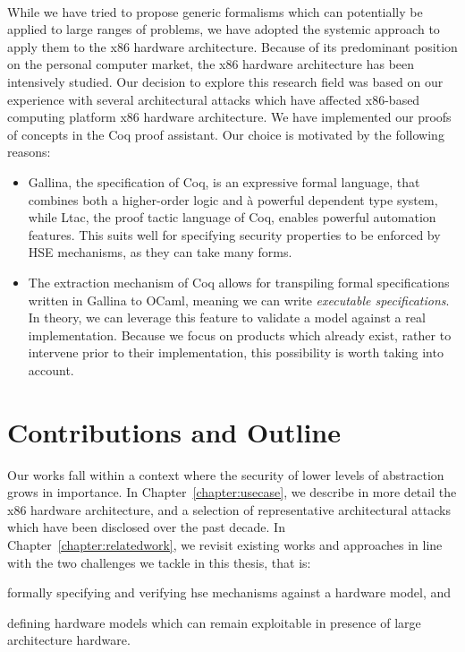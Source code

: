 \paragraph{}
%
While we have tried to propose generic formalisms which can potentially be
applied to large ranges of problems, we have adopted the systemic approach to
apply them to the x86 hardware architecture.
%
Because of its predominant position on the personal computer market, the x86
hardware architecture has been intensively studied.
%
Our decision to explore this research field was based on our experience with
several architectural attacks which have affected x86-based computing platform
x86 hardware architecture.
%
We have implemented our proofs of concepts in the Coq proof assistant.
%
Our choice is motivated by the following reasons:
%
\begin{itemize}
\item {\sc Gallina}, the specification of Coq, is an expressive formal language,
  that combines both a higher-order logic and à powerful dependent type system,
  while {\sc Ltac}, the proof tactic language of Coq, enables powerful
  automation features.
  This suits well for specifying security properties to be enforced by HSE
  mechanisms, as they can take many forms.
\item The extraction mechanism of Coq allows for transpiling formal
  specifications written in {\sc Gallina} to OCaml, meaning we can write
  \emph{executable specifications}.
  In theory, we can leverage this feature to validate a model against a real
  implementation.
  Because we focus on products which already exist, rather to intervene prior to
  their implementation, this possibility is worth taking into account.
\end{itemize}

\section{Contributions and Outline}

Our works fall within a context where the security of lower levels of
abstraction grows in importance.
%
In Chapter~\ref{chapter:usecase}, we describe in more detail the x86 hardware
architecture, and a selection of representative architectural attacks which have
been disclosed over the past decade.
%
In Chapter~\ref{chapter:relatedwork}, we revisit existing works and approaches
in line with the two challenges we tackle in this thesis, that is:
%
\begin{inparaenum}[(1)]
\item formally specifying and verifying \ac{hse} mechanisms against a hardware
  model, and
%
\item defining hardware models which can remain exploitable in presence of large
  architecture hardware.
\end{inparaenum}

